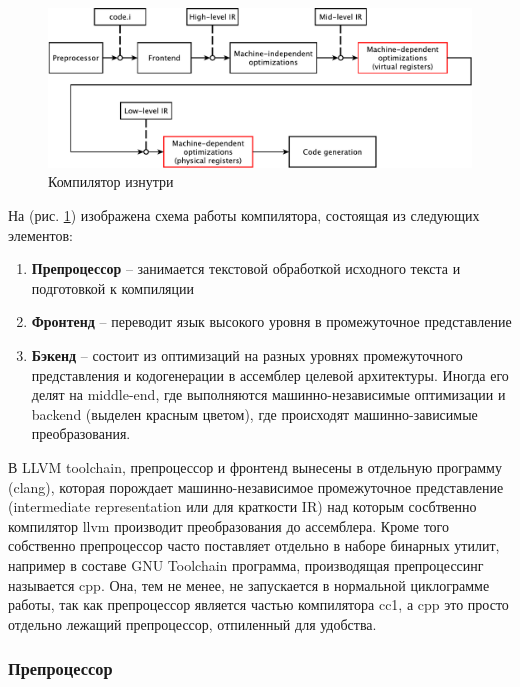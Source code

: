 \documentclass[a4paper,12pt,oneside]{article}
\begin{document}
\begin{figure}[ht]
\centering
\includegraphics[width=1.0\textwidth]{illustrations/compiler-crop.pdf}
\caption{Компилятор изнутри}
\label{fig:compiler_scheme}
\end{figure}

На (рис. \ref{fig:compiler_scheme}) изображена схема работы компилятора, состоящая из следующих элементов:

\begin{enumerate}
\item \textbf{Препроцессор} -- занимается текстовой обработкой исходного текста и подготовкой к компиляции
\item \textbf{Фронтенд} -- переводит язык высокого уровня в промежуточное представление
\item \textbf{Бэкенд} -- состоит из оптимизаций на разных уровнях промежуточного представления и кодогенерации в ассемблер целевой архитектуры. Иногда его делят на middle-end, где выполняются машинно-независимые оптимизации и backend (выделен красным цветом), где происходят машинно-зависимые преобразования.
\end{enumerate}

В LLVM toolchain, препроцессор и фронтенд вынесены в отдельную программу (clang), которая порождает машинно-независимое промежуточное представление (intermediate representation или для краткости IR) над которым сосбтвенно компилятор llvm производит преобразования до ассемблера. Кроме того собственно препроцессор часто поставляет отдельно в наборе бинарных утилит, например в составе GNU Toolchain программа, производящая препроцессинг называется cpp. Она, тем не менее, не запускается в нормальной циклограмме работы, так как препроцессор является частью компилятора cc1, а cpp это просто отдельно лежащий препроцессор, отпиленный для удобства.

\subsubsection{Препроцессор}
\end{document}
